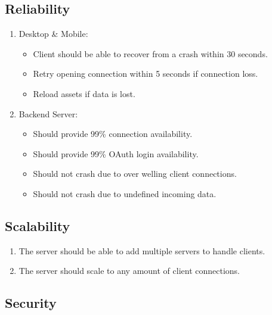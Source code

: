 \documentclass[letterpaper]{article}
\begin{document}
			\subsection*{Reliability}
			\vspace{0.1in}
			
			\begin{enumerate}
				\item Desktop \& Mobile:
					\begin{itemize}
						\item Client should be able to recover from a crash within 30 seconds.
						\item Retry opening connection within 5 seconds if connection loss.
						\item Reload assets if data is lost.
					\end{itemize}
				\item Backend Server:
					\begin{itemize}
						\item Should provide 99\% connection availability.
						\item Should provide 99\% OAuth login availability.
						\item Should not crash due to over welling client connections.
						\item Should not crash due to undefined incoming data.
					\end{itemize}
			\end{enumerate}
			
			\subsection*{Scalability}
			\vspace{0.1in}
			
			\begin{enumerate}
				\item The server should be able to add multiple servers to handle clients.
				\item The server should scale to any amount of client connections.
			\end{enumerate}
			
			\subsection*{Security}
			\vspace{0.1in}
			
\end{document}
